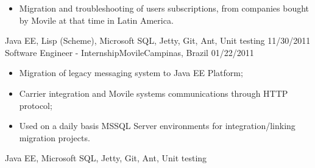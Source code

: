 \begin{experiences}
{\begin{itemize}
             used by Movile's Mobile Billing and Messaging systems;
            \item Migration and troubleshooting of users subscriptions, from companies bought by Movile at that time in Latin America.\\
          \end{itemize}
        }{Java EE, Lisp (Scheme), Microsoft SQL, Jetty, Git, Ant, Unit testing}
  \emptySeparator
  \experience
    {11/30/2011} {Software Engineer - Internship}{Movile}{Campinas, Brazil}
    {01/22/2011}
          {
            \begin{itemize}
              \item Migration of legacy messaging system to Java EE Platform;
              \item Carrier integration and Movile systems communications through HTTP protocol;
              \item Used on a daily basis MSSQL Server environments for integration/linking migration projects.\\
            \end{itemize}
          }{Java EE, Microsoft SQL, Jetty, Git, Ant, Unit testing}
\end{experiences}
